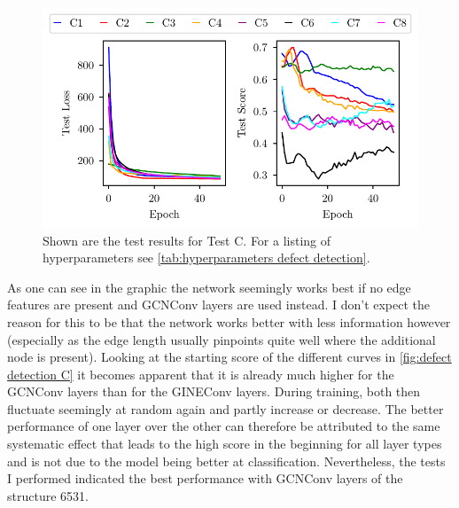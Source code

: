 \documentclass[11pt,a4paper]{article}
\begin{document}
\begin{figure}[htbp]
\centering
\includegraphics{images/plots/defect_detection_C.pdf}
\caption{Shown are the test results for Test C. For a listing of hyperparameters see \autoref{tab:hyperparameters defect detection}.}
\label{fig:defect detection C}
\end{figure}

As one can see in the graphic the network seemingly works best if no edge features are present and GCNConv layers are used instead. 
I don't expect the reason for this to be that the network works better with less information however (especially as the edge length usually pinpoints quite well where the additional node is present). 
Looking at the starting score of the different curves in \autoref{fig:defect detection C} it becomes apparent that it is already much higher for the GCNConv layers than for the GINEConv layers. 
During training, both then fluctuate seemingly at random again and partly increase or decrease. 
The better performance of one layer over the other can therefore be attributed to the same systematic effect that leads to the high score in the beginning for all layer types and is not due to the model being better at classification. 
Nevertheless, the tests I performed indicated the best performance with GCNConv layers of the structure 6531. \\
\end{document}
